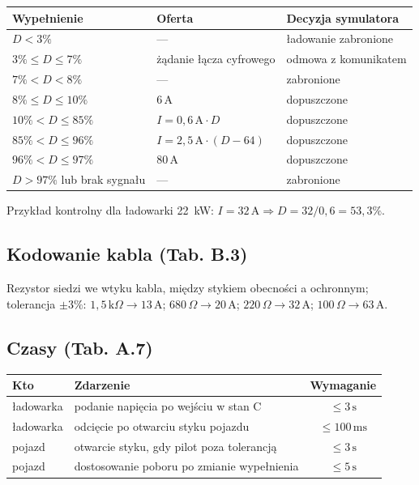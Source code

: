\documentclass[a4paper,11pt]{article}
\newcommand{\ohm}{\,\Omega}
\newcommand{\kohm}{\,\mathrm{k}\Omega}
\newcommand{\amp}{\,\mathrm{A}}
\newcommand{\ms}{\,\mathrm{ms}}
\newcommand{\sek}{\,\mathrm{s}}
\begin{document}
\begin{center}
\begin{tabular}{lll}
\toprule
Wypełnienie & Oferta & Decyzja symulatora \\
\midrule
$D<3\%$              & ---                       & ładowanie zabronione \\
$3\% \le D \le 7\%$  & żądanie łącza cyfrowego   & odmowa z komunikatem \\
$7\% < D < 8\%$      & ---                       & zabronione \\
$8\% \le D \le 10\%$ & $6\amp$                   & dopuszczone \\
$10\% < D \le 85\%$  & $I = 0{,}6\amp \cdot D$   & dopuszczone \\
$85\% < D \le 96\%$  & $I = 2{,}5\amp \cdot (D-64)$ & dopuszczone \\
$96\% < D \le 97\%$  & $80\amp$                  & dopuszczone \\
$D>97\%$ lub brak sygnału & ---                  & zabronione \\
\bottomrule
\end{tabular}
\end{center}

Przykład kontrolny dla ładowarki 22~kW: $I=32\amp \Rightarrow D = 32/0{,}6 = 53{,}3\%$.

\subsection{Kodowanie kabla (Tab. B.3)}

Rezystor siedzi we wtyku kabla, między stykiem obecności a ochronnym; tolerancja
$\pm3\%$: $1{,}5\kohm \to 13\amp$; $680\ohm \to 20\amp$; $220\ohm \to 32\amp$;
$100\ohm \to 63\amp$.

\subsection{Czasy (Tab. A.7)}

\begin{center}
\begin{tabular}{llc}
\toprule
Kto & Zdarzenie & Wymaganie \\
\midrule
ładowarka & podanie napięcia po wejściu w stan C & $\le 3\sek$ \\
ładowarka & odcięcie po otwarciu styku pojazdu   & $\le 100\ms$ \\
pojazd    & otwarcie styku, gdy pilot poza tolerancją & $\le 3\sek$ \\
pojazd    & dostosowanie poboru po zmianie wypełnienia & $\le 5\sek$ \\
\bottomrule
\end{tabular}
\end{center}
\end{document}
